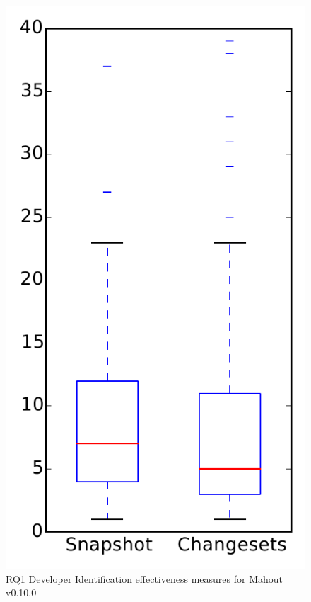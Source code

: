 
\begin{figure}
\centering
\includegraphics[height=0.4\textheight]{figures/dit/rq1_mahout}
\caption{RQ1 Developer Identification effectiveness measures for Mahout v0.10.0}
\label{fig:dit:rq1:mahout}
\end{figure}
